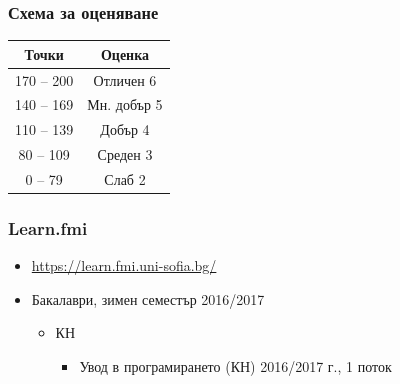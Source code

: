 \documentclass{beamer}
\begin{document}
\begin{frame}
  \frametitle{Схема за оценяване}

  \begin{center}
    \begin{tabular}{|c|c|}
      \hline
      \textbf{Точки} & \textbf{Оценка}\\
      \hline\hline
      170 -- 200&Отличен 6\\
      \hline
      140 -- 169&Мн. добър 5\\
      \hline
      110 -- 139&Добър 4\\
      \hline
      80  -- 109&Среден 3\\
      \hline
      0   --  79&Слаб 2\\
      \hline
    \end{tabular}
  \end{center}
\end{frame}

\begin{frame}
  \frametitle{Learn.fmi}
  
  \begin{itemize}
  \item \url{https://learn.fmi.uni-sofia.bg/}
  \item Бакалаври, зимен семестър 2016/2017
    \begin{itemize}
    \item КН
      \begin{itemize}
      \item Увод в програмирането (КН) 2016/2017 г., 1 поток
      \end{itemize}
    \end{itemize}
  \end{itemize}
\end{frame}

    
\end{document}
